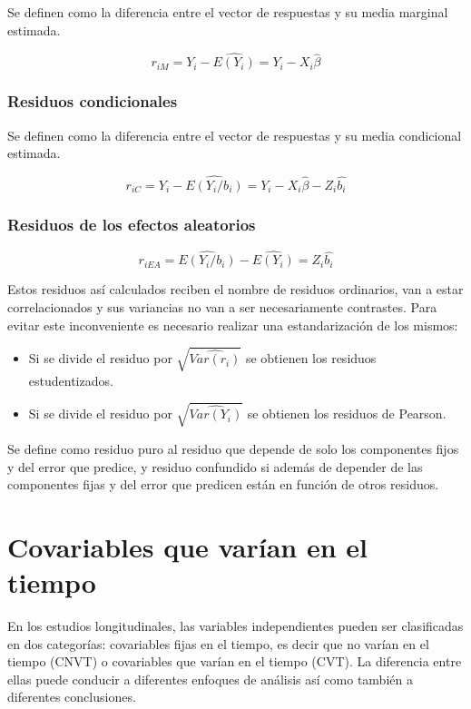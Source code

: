 \documentclass[spanish]{article}
\numberwithin{figure}{subsection}
\numberwithin{equation}{subsection}
\numberwithin{table}{subsection}
\begin{document}
Se definen como la diferencia entre el vector de respuestas y su media marginal estimada.

\[ r_{iM} = Y_i - \widehat{E(Y_i)} = Y_i - X_i\hat{\beta} \]

\subsubsection{Residuos condicionales}

Se definen como la diferencia entre el vector de respuestas y su media condicional estimada.

\[ r_{iC} = Y_i - \widehat{E(Y_i/b_i)} = Y_i - X_i\hat{\beta} - Z_i\hat{b_i} \]

\subsubsection{Residuos de los efectos aleatorios}

\[ r_{iEA} = \widehat{E(Y_i/b_i)} - \widehat{E(Y_i)} = Z_i\hat{b_i} \]

Estos residuos así calculados reciben el nombre de residuos ordinarios, van a estar correlacionados y sus variancias no
van a ser necesariamente contrastes. Para evitar este inconveniente es necesario realizar una estandarización de los mismos:

\begin{itemize}
	\item Si se divide el residuo por $\sqrt{\widehat{Var(r_i)}}$ se obtienen los residuos estudentizados.
	\item Si se divide el residuo por $\sqrt{\widehat{Var(Y_i)}}$ se obtienen los residuos de Pearson.
\end{itemize}

Se define como residuo puro al residuo que depende de solo los componentes fijos y del error que predice, y residuo
confundido si además de depender de las componentes fijas y del error que predicen están en función de otros residuos.


\section{Covariables que varían en el tiempo}

En los estudios longitudinales, las variables independientes pueden ser clasificadas en dos categorías: covariables fijas
en el tiempo, es decir que no varían en el tiempo (CNVT) o covariables que varían en el tiempo (CVT). La diferencia entre
ellas puede conducir a diferentes enfoques de análisis así como también a diferentes conclusiones.
\end{document}
